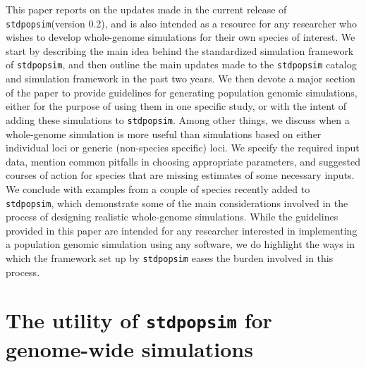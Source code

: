 \documentclass[hidelinks]{article}
\newcommand{\stdpopsim}{\texttt{stdpopsim}\xspace}
\begin{document}
This paper reports on the updates made in the current release of \stdpopsim  (version 0.2),
and is also intended as a resource for any researcher
who wishes to develop whole-genome simulations for their own species of interest.
We start by describing the main idea behind the standardized simulation framework
of \stdpopsim,
and then outline the main updates made to the \stdpopsim catalog and simulation framework
in the past two years.
We then devote a major section of the paper to provide guidelines for
generating population genomic simulations, either for the purpose of using them in one specific study,
or with the intent of adding these simulations to \stdpopsim.
Among other things, we discuss when a whole-genome simulation is more useful than
simulations based on either individual loci or generic (non-species specific) loci.
We specify the required input data,
mention common pitfalls in choosing appropriate parameters,
and suggested courses of action for species that are missing estimates of some necessary inputs.
We conclude with examples from a couple of species recently added to \stdpopsim,
which demonstrate some of the main considerations involved in the process of designing realistic whole-genome simulations.
While the guidelines provided in this paper are intended for any researcher interested in implementing a population genomic simulation using any software,
we do highlight the ways in which the framework set up by \stdpopsim eases the burden involved in this process.




\section*{The utility of \stdpopsim for genome-wide simulations}
    \label{sec:std-sim}
%
\end{document}
